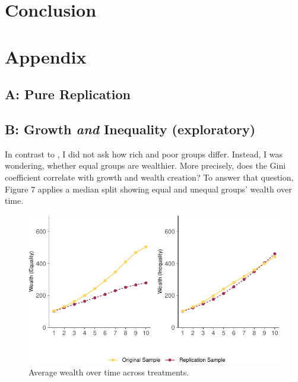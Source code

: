 \documentclass[
  authoryear,
  preprint,
  3p]{elsarticle}
\begin{document}
\hypertarget{conclusion}{%
\section{Conclusion}\label{conclusion}}

\hypertarget{appendix}{%
\section{Appendix}\label{appendix}}

\hypertarget{a-pure-replication}{%
\subsection{A: Pure Replication}\label{a-pure-replication}}

\hypertarget{b-growth-and-inequality-exploratory}{%
\subsection{\texorpdfstring{B: Growth \emph{and} Inequality
(exploratory)}{B: Growth and Inequality (exploratory)}}\label{b-growth-and-inequality-exploratory}}

In contrast to \citet{GMTV2017}, I did not ask how rich and poor groups
differ. Instead, I was wondering, whether equal groups are wealthier.
More precisely, does the Gini coefficient correlate with growth and
wealth creation? To answer that question, Figure 7 applies a median
split showing equal and unequal groups' wealth over time.

\begin{figure}

{\centering \includegraphics{paper_files/figure-pdf/plotStockByGini-1.pdf}

}

\caption{Average wealth over time across treatments.}

\end{figure}


  
\end{document}
